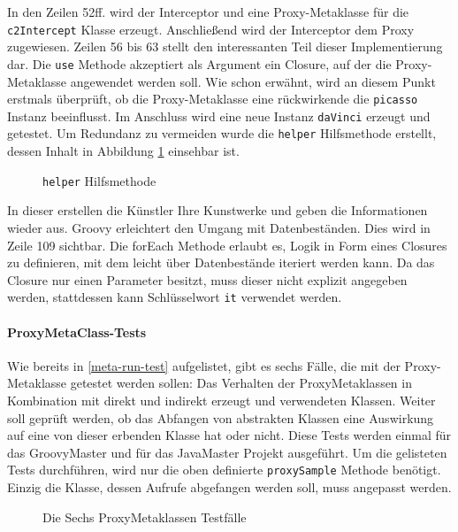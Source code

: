 In den Zeilen 52ff. wird der Interceptor und eine Proxy-Metaklasse für die \texttt{c2Intercept} Klasse erzeugt. 
Anschließend wird der Interceptor dem Proxy zugewiesen.
Zeilen 56 bis 63 stellt den interessanten Teil dieser Implementierung dar. 
Die \texttt{use} Methode akzeptiert als Argument ein Closure, auf der die Proxy-Metaklasse angewendet werden soll.
Wie schon erwähnt, wird an diesem Punkt erstmals überprüft, ob die Proxy-Metaklasse eine rückwirkende die \texttt{picasso} Instanz beeinflusst. 
Im Anschluss wird eine neue Instanz \texttt{daVinci} erzeugt und getestet.
Um Redundanz zu vermeiden wurde die \texttt{helper} Hilfsmethode  erstellt, dessen Inhalt in Abbildung \ref{fig:MetaTester-helper} einsehbar ist.


\begin{figure}[hbt!]
	
		\caption{\texttt{helper} Hilfsmethode}
	\label{fig:MetaTester-helper}
\end{figure}


In dieser erstellen die Künstler Ihre Kunstwerke und geben die Informationen wieder aus.
Groovy erleichtert den Umgang mit Datenbeständen. Dies wird in Zeile 109 sichtbar.
Die forEach Methode erlaubt es, Logik in Form eines Closures zu definieren, mit dem leicht über Datenbestände iteriert werden kann.
Da das Closure nur einen Parameter besitzt, muss dieser nicht explizit angegeben werden, stattdessen kann Schlüsselwort \texttt{it} verwendet werden.


\paragraph{ProxyMetaClass-Tests}
Wie bereits in \ref{meta-run-test} aufgelistet, gibt es sechs Fälle, die mit der Proxy-Metaklasse getestet werden sollen:
Das Verhalten der ProxyMetaklassen in Kombination mit direkt und indirekt erzeugt und verwendeten Klassen. 
Weiter soll geprüft werden, ob das Abfangen von abstrakten Klassen eine Auswirkung auf eine von dieser erbenden Klasse hat oder nicht. 
Diese Tests werden einmal für das GroovyMaster und für das JavaMaster Projekt ausgeführt.
Um die gelisteten Tests durchführen, wird nur die oben definierte \texttt{proxySample} Methode benötigt.
Einzig die Klasse, dessen Aufrufe abgefangen werden soll, muss angepasst werden. 

\begin{figure}[hbt!]
	
	\caption{Die Sechs ProxyMetaklassen Testfälle}
	\label{fig:MetaTester-Proxy-Cases}
\end{figure}

